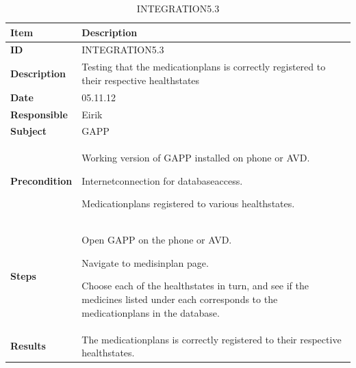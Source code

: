 \clearpage{}
\begin{table}
	\centering
		\begin{tabular}{|p{3.0cm}|p{14.0cm}|}
			\hline
			\bf{Item} & \bf{Description}\\
			\hline
			\bf{ID} & INTEGRATION5.3\\
			\bf{Description} & Testing that the medicationplans is correctly registered to their respective healthstates\\
			\bf{Date} & 05.11.12\\
			\bf{Responsible} & Eirik\\
			\bf{Subject} & GAPP\\
			\bf{Precondition} & 
				\begin{tabulitem}
					\item Working version of GAPP installed on phone or AVD.
					\item Internetconnection for databaseaccess.
					\item Medicationplans registered to various healthstates.
				\end{tabulitem}\\
			\bf{Steps} &
			\begin{tabulenum}
				\item Open GAPP on the phone or AVD.
				\item Navigate to medisinplan page.
				\item Choose each of the healthstates in turn, and see if the medicines listed under each corresponds to the medicationplans in the database.
			\end{tabulenum}\\
			\hline
			\bf{Results} & The medicationplans is correctly registered to their respective healthstates.\\
			\hline
		\end{tabular}
	\caption{INTEGRATION5.3}
	\label{tab:integration5.3}
\end{table}


